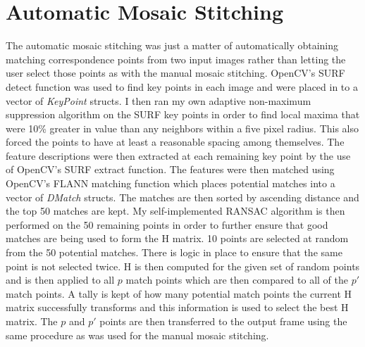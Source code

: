 \documentclass[10pt,twocolumn,letterpaper]{article}
\begin{document}
\section{Automatic Mosaic Stitching}
The automatic mosaic stitching was just a matter of automatically obtaining matching correspondence points from two input images rather than letting the user select those points as with the manual mosaic stitching. OpenCV's SURF detect function was used to find key points in each image and were placed in to a vector of \emph{KeyPoint} structs. I then ran my own adaptive non-maximum suppression algorithm on the SURF key points in order to find local maxima that were 10\% greater in value than any neighbors within a five pixel radius. This also forced the points to have at least a reasonable spacing among themselves. The feature descriptions were then extracted at each remaining key point by the use of OpenCV's SURF extract function. The features were then matched using OpenCV's FLANN matching function which places potential matches into a vector of \emph{DMatch} structs. The matches are then sorted by ascending distance and the top 50 matches are kept. My self-implemented RANSAC algorithm is then performed on the 50 remaining points in order to further ensure that good matches are being used to form the H matrix. 10 points are selected at random from the 50 potential matches. There is logic in place to ensure that the same point is not selected twice. H is then computed for the given set of random points and is then applied to all $p$ match points which are then compared to all of the $p'$ match points. A tally is kept of how many potential match points the current H matrix successfully transforms and this information is used to select the best H matrix. The $p$ and $p'$ points are then transferred to the output frame using the same procedure as was used for the manual mosaic stitching.
\end{document}
